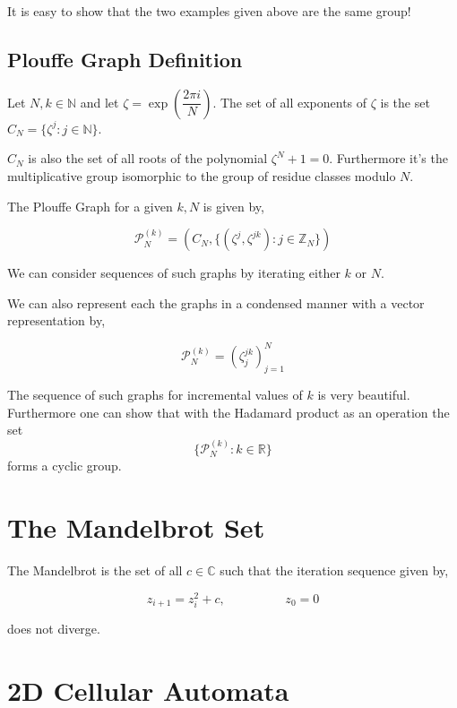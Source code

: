 \documentclass[a4paper,12pt]{article}
\begin{document}
It is easy to show that the two examples given above are the same group!

\subsection{Plouffe Graph Definition}

Let \(N, k \in \mathbb{N}\) and let \(\zeta = \exp\left(\dfrac{2 \pi i}{N}\right)\).
The set of all exponents of \(\zeta\) is the set \(C_N = \{ \zeta^j : j \in \mathbb{N}\}\).

\(C_N\) is also the set of all roots of the polynomial \( \zeta^N  + 1 = 0 \). Furthermore it's the multiplicative group isomorphic to the group of residue classes modulo \(N\).

The Plouffe Graph for a given \(k, N\) is given by,

\[ \mathcal{P}^{(k)}_N = \left( C_N, \{ \left( \zeta^j, \zeta^{jk} \right) : j \in \mathbb{Z}_N \} \right) \]

We can consider sequences of such graphs by iterating either \(k\) or \(N\). 

We can also represent each the graphs in a condensed manner with a vector representation by, 

\[ \mathcal{P}^{(k)}_N = \left(\zeta^{jk}_j\right)^{N}_{j=1} \]

The sequence of such graphs for incremental values of \(k\) is very beautiful. Furthermore one can show that with the Hadamard product as an operation the set \[\{ \mathcal{P}^{(k)}_N : k \in \mathbb{R} \}\] forms a cyclic group.

\section{The Mandelbrot Set}

The Mandelbrot is the set of all \(c \in \mathbb{C}\) such that the iteration sequence given by,

\[
z_{i+1} = z^2_i + c , \hspace{2cm} z_0 = 0 
\]

does not diverge.
\section{2D Cellular Automata}
\end{document}
